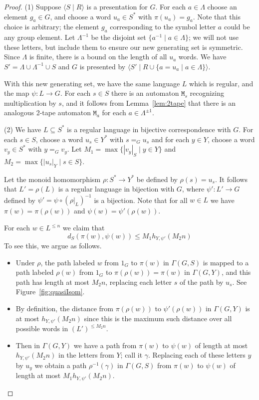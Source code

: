 \documentclass[11pt]{amsart}
\theoremstyle{definition}
\begin{document}
\begin{proof}
(1)  Suppose $\langle S\mid R\rangle$ is a presentation for $G$.
For each $a\in \Lambda$ choose an element $g_a\in G$, and  choose a word $u_a\in S^*$ with $\pi(u_a)=g_a$.
Note that this choice is arbitrary; the element $g_a$ corresponding to the symbol letter $a$ could be any group element.
Let $\Lambda^{-1}$ be the disjoint set $\{a^{-1}\mid a\in \Lambda\}$; we will not use these letters, but include them to ensure our new generating set is symmetric.
Since $\Lambda$ is finite, there is a bound on the length of all $u_a$ words.
We have  $S'=\Lambda\cup\Lambda^{-1}\cup S$ and
 $G$ is presented by $\langle S'\mid R\cup\{a=u_a\mid a\in\Lambda\}\rangle$.

With this new generating set, we have the same language $L$  which is regular, and the map $\psi:L\to G$.
For each $s\in S$ there is an automaton $\texttt{M}_s$ recognizing multiplication by $s$, and it follows from Lemma~\ref{lem:2tape} that there is an analogous 2-tape automaton $\texttt{M}_a$ for each $a\in \Lambda^{\pm 1}$.



(2)
 We have $L\subseteq S^*$ is a regular language in bijective correspondence with $G$. For each $s\in S$, choose a word $u_s\in Y^*$ with $s=_Gu_s$ and for each $y\in Y$, choose a word $v_y\in S^*$ with $y=_Gv_y$. Let $M_1=\max\{|v_y|_S\mid y\in Y\}$ and
 $M_2=\max\{|u_s|_Y\mid s\in S\}$.


 Let the monoid homomorphism $\rho:S^*\to Y^*$ be defined by $\rho(s)=u_s$. It follows that $L'=\rho(L)$ is a regular language in bijection with $G$, where
 $\psi':L'\to G$  defined by $\psi'=\psi\circ\left(\rho|_L\right)^{-1}$ is a bijection.
 Note that for all $w\in L$ we have $\pi(w)=\pi(\rho(w))$ and $\psi(w)=\psi'(\rho(w))$.

 For each $w\in L^{\leq n}$ we claim that
 \begin{equation}\label{eqn:inequality}
d_S\left(\pi(w), \psi(w)\right)\leq
 M_1h_{Y,\psi'}\left(M_2n\right)
 \end{equation}
 To see this, we argue as follows.
 \begin{itemize}
     \item Under $\rho$, the path labeled $w$ from $1_G$ to $\pi(w)$ in $\Gamma(G,S)$ is mapped to a path labeled $\rho(w)$ from $1_G$ to $\pi(\rho(w))=\pi(w)$ in $\Gamma(G,Y)$, and this path has length at most $M_2n$, replacing each letter $s$ of the path by $u_s$.   See  Figure~\ref{fig:quasiIsom}.
     \item By definition, the distance from $\pi(\rho(w))$ to $\psi'(\rho(w))$ in $\Gamma(G,Y)$ is at most
$h_{Y,\psi'}(M_2n)$ since this is the maximum such distance over all possible words in $(L')^{\leq M_2n}$.
\item Then in $\Gamma(G,Y)$ we have a path from $\pi(w)$ to $\psi(w)$ of length at most $h_{Y,\psi'}(M_2n)$ in the letters from $Y$; call it $\gamma$. Replacing each of these letters $y$ by $u_y$ we obtain a path $\rho^{-1}(\gamma)$ in $\Gamma(G,S)$ from $\pi(w)$ to $\psi(w)$ of length at most $M_1h_{Y,\psi'}(M_2n)$.
 \end{itemize}







\end{proof}
\end{document}
